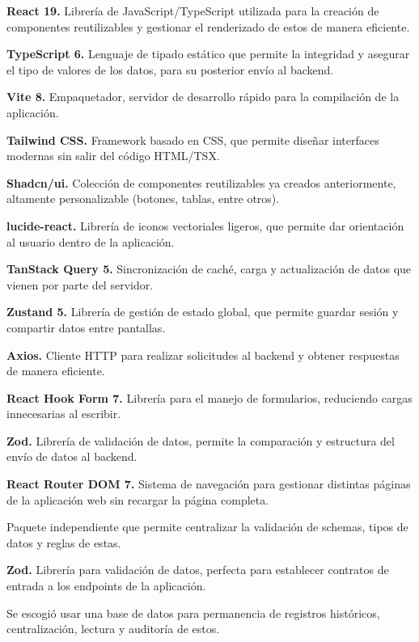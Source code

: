 \textbf{React 19.} Librería de JavaScript/TypeScript utilizada para la creación de componentes reutilizables y gestionar el renderizado de estos de manera eficiente.\par
\textbf{TypeScript 6.} Lenguaje de tipado estático que permite la integridad y asegurar el tipo de valores de los datos, para su posterior envío al backend.\par
\textbf{Vite 8.} Empaquetador, servidor de desarrollo rápido para la compilación de la aplicación.\par
\textbf{Tailwind CSS.} Framework basado en CSS, que permite diseñar interfaces modernas sin salir del código HTML/TSX.\par
\textbf{Shadcn/ui.} Colección de componentes reutilizables ya creados anteriormente, altamente personalizable (botones, tablas, entre otros).\par
\textbf{lucide-react.} Librería de iconos vectoriales ligeros, que permite dar orientación al usuario dentro de la aplicación.\par
\textbf{TanStack Query 5.} Sincronización de caché, carga y actualización de datos que vienen por parte del servidor.\par
\textbf{Zustand 5.} Librería de gestión de estado global, que permite guardar sesión y compartir datos entre pantallas.\par
\textbf{Axios.} Cliente HTTP para realizar solicitudes al backend y obtener respuestas de manera eficiente.\par
\textbf{React Hook Form 7.} Librería para el manejo de formularios, reduciendo cargas innecesarias al escribir.\par
\textbf{Zod.} Librería de validación de datos, permite la comparación y estructura del envío de datos al backend.\par
\textbf{React Router DOM 7.} Sistema de navegación para gestionar distintas páginas de la aplicación web sin recargar la página completa.\par
{} 
Paquete independiente que permite centralizar la validación de schemas, tipos de datos y reglas de estas. \par

\textbf{Zod.} Librería para validación de datos, perfecta para establecer contratos de entrada a los endpoints de la aplicación.

Se escogió usar una base de datos para permanencia de registros históricos, centralización, lectura y auditoría de estos.

